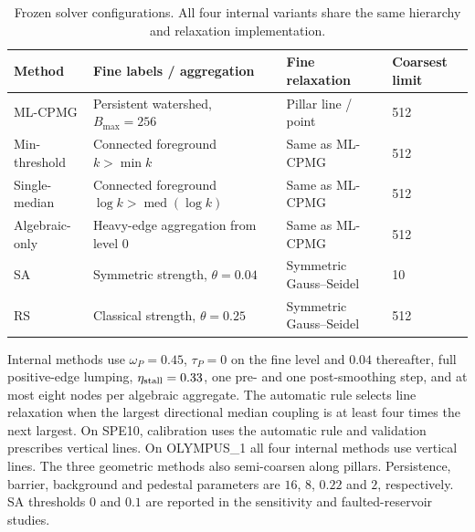 \begin{table}[pos=!tbp]\centering
\caption{Frozen solver configurations. All four internal variants share the same hierarchy and relaxation implementation.}\label{tab:configuration}
\begin{tabular}{llll}
\toprule
Method & Fine labels / aggregation & Fine relaxation & Coarsest limit\\
\midrule
ML-CPMG & Persistent watershed, $B_{\max}=256$ & Pillar line / point &512\\
Min-threshold & Connected foreground $k>\min k$ & Same as ML-CPMG &512\\
Single-median & Connected foreground $\log k>\operatorname{med}(\log k)$ & Same as ML-CPMG &512\\
Algebraic-only & Heavy-edge aggregation from level 0 & Same as ML-CPMG &512\\
SA & Symmetric strength, $\theta=0.04$ & Symmetric Gauss--Seidel &10\\
RS & Classical strength, $\theta=0.25$ & Symmetric Gauss--Seidel &512\\
\bottomrule
\end{tabular}
\par\smallskip\footnotesize
Internal methods use $\omega_P=0.45$, $\tau_P=0$ on the fine level and $0.04$
thereafter, full positive-edge lumping, $\eta_{\rm stall}=0.33$, one pre- and
one post-smoothing step, and at most eight nodes per algebraic aggregate.
The automatic rule selects line relaxation when the largest directional median
coupling is at least four times the next largest. On SPE10, calibration uses
the automatic rule and validation prescribes vertical lines. On OLYMPUS\_1 all
four internal methods use vertical lines. The three geometric methods also
semi-coarsen along pillars. Persistence, barrier, background and pedestal
parameters are $16$, $8$, $0.22$ and $2$, respectively. SA thresholds $0$ and
$0.1$ are reported in the sensitivity and faulted-reservoir studies.\normalsize
\end{table}
